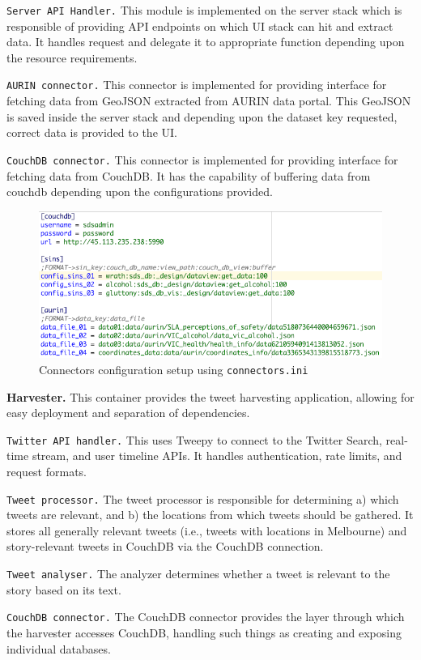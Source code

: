 \texttt{Server API Handler.} This module is implemented on the server stack which is responsible of providing API endpoints on which UI stack can hit and extract data. It handles request and delegate it to appropriate function depending upon the resource requirements.

\texttt{AURIN connector.} This connector is implemented for providing interface for fetching data from GeoJSON extracted from AURIN data portal. This GeoJSON is saved inside the server stack and depending upon the dataset key requested, correct data is provided to the UI.

\texttt{CouchDB connector.} This connector is implemented for providing interface for fetching data from CouchDB. It has the capability of buffering data from couchdb depending upon the configurations provided.

\begin{figure}[H]
    \centering
    \includegraphics[width=12cm,keepaspectratio=true]{images/connector_config.png}
    \caption{Connectors configuration setup using \texttt{connectors.ini}}
    \label{fig:connectorconfig}
\end{figure}

\textbf{Harvester.} This container provides the tweet harvesting application, allowing for easy deployment and separation of dependencies.

\texttt{Twitter API handler.} This uses Tweepy to connect to the Twitter Search, real-time stream, and user timeline APIs. It handles authentication, rate limits, and request formats.

\texttt{Tweet processor.} The tweet processor is responsible for determining a) which tweets are relevant, and b) the locations from which tweets should be gathered. It stores all generally relevant tweets (i.e., tweets with locations in Melbourne) and story-relevant tweets in CouchDB via the CouchDB connection.

\texttt{Tweet analyser.} The analyzer determines whether a tweet is relevant to the story based on its text.

\texttt{CouchDB connector.} The CouchDB connector provides the layer through which the harvester accesses CouchDB, handling such things as creating and exposing individual databases.